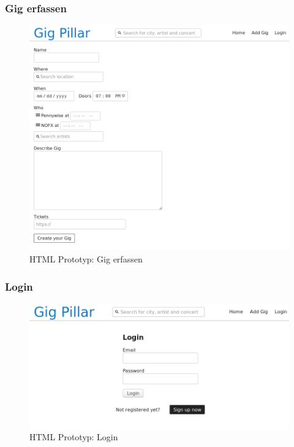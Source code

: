 \clearpage
\subsubsection{Gig erfassen}

\begin{figure}[!htb]
  \centering
  \includegraphics[width=1\textwidth]{realisierung/html-proto-add-gig.png}
  \caption{HTML Prototyp: Gig erfassen}
\end{figure}

\clearpage
\subsubsection{Login}

\begin{figure}[!htb]
  \centering
  \includegraphics[width=1\textwidth]{realisierung/html-proto-login.png}
  \caption{HTML Prototyp: Login}
\end{figure}

